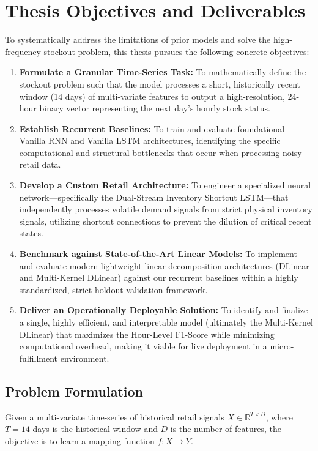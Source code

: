 \chapter{Thesis Objectives and Deliverables}
\label{chap:objectives}

To systematically address the limitations of prior models and solve the high-frequency stockout problem, this thesis pursues the following concrete objectives:

\begin{enumerate}
    \item \textbf{Formulate a Granular Time-Series Task:} To mathematically define the stockout problem such that the model processes a short, historically recent window (14 days) of multi-variate features to output a high-resolution, 24-hour binary vector representing the next day's hourly stock status.
    \item \textbf{Establish Recurrent Baselines:} To train and evaluate foundational Vanilla RNN and Vanilla LSTM architectures, identifying the specific computational and structural bottlenecks that occur when processing noisy retail data.
    \item \textbf{Develop a Custom Retail Architecture:} To engineer a specialized neural network—specifically the Dual-Stream Inventory Shortcut LSTM—that independently processes volatile demand signals from strict physical inventory signals, utilizing shortcut connections to prevent the dilution of critical recent states.
    \item \textbf{Benchmark against State-of-the-Art Linear Models:} To implement and evaluate modern lightweight linear decomposition architectures (DLinear and Multi-Kernel DLinear) against our recurrent baselines within a highly standardized, strict-holdout validation framework.
    \item \textbf{Deliver an Operationally Deployable Solution:} To identify and finalize a single, highly efficient, and interpretable model (ultimately the Multi-Kernel DLinear) that maximizes the Hour-Level F1-Score while minimizing computational overhead, making it viable for live deployment in a micro-fulfillment environment.
\end{enumerate}

\section{Problem Formulation}

Given a multi-variate time-series of historical retail signals $X \in \mathbb{R}^{T \times D}$, where $T=14$ days is the historical window and $D$ is the number of features, the objective is to learn a mapping function $f: X \rightarrow Y$. 

